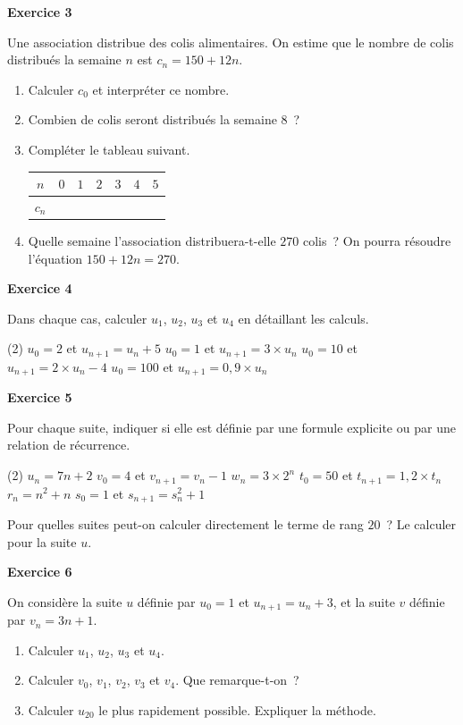 \documentclass[a4paper,11pt]{article}
\newenvironment{exercice}[1]{%
  \Needspace{6\baselineskip}\par\bigskip\noindent\textbf{Exercice #1}\par\smallskip\noindent\ignorespaces
}{%
  \par
}
\begin{document}
\begin{exercice}{3}
Une association distribue des colis alimentaires. On estime que le nombre de colis distribués la semaine $n$ est $c_n = 150 + 12n$.
\begin{enumerate}[label=\arabic*.]
\item Calculer $c_0$ et interpréter ce nombre.
\item Combien de colis seront distribués la semaine $8$~?
\item Compléter le tableau suivant.

\renewcommand{\arraystretch}{1.4}
\begin{tabular}{|c|*{6}{C{1.1cm}|}}
  \hline
  $n$ & $0$ & $1$ & $2$ & $3$ & $4$ & $5$ \\
  \hline
  $c_n$ & & & & & & \\
  \hline
\end{tabular}
\item Quelle semaine l'association distribuera-t-elle $270$ colis~? On pourra résoudre l'équation $150 + 12n = 270$.
\end{enumerate}
\end{exercice}

\begin{exercice}{4}
Dans chaque cas, calculer $u_1$, $u_2$, $u_3$ et $u_4$ en détaillant les calculs.
\begin{tasks}(2)
\task $u_0 = 2$ et $u_{n+1} = u_n + 5$
\task $u_0 = 1$ et $u_{n+1} = 3 \times u_n$
\task $u_0 = 10$ et $u_{n+1} = 2 \times u_n - 4$
\task $u_0 = 100$ et $u_{n+1} = 0{,}9 \times u_n$
\end{tasks}
\end{exercice}

\begin{exercice}{5}
Pour chaque suite, indiquer si elle est définie par une formule explicite ou par une relation de récurrence.
\begin{tasks}(2)
\task $u_n = 7n + 2$
\task $v_0 = 4$ et $v_{n+1} = v_n - 1$
\task $w_n = 3 \times 2^n$
\task $t_0 = 50$ et $t_{n+1} = 1{,}2 \times t_n$
\task $r_n = n^2 + n$
\task $s_0 = 1$ et $s_{n+1} = s_n^2 + 1$
\end{tasks}
Pour quelles suites peut-on calculer directement le terme de rang $20$~? Le calculer pour la suite $u$.
\end{exercice}

\begin{exercice}{6}
On considère la suite $u$ définie par $u_0 = 1$ et $u_{n+1} = u_n + 3$, et la suite $v$ définie par $v_n = 3n + 1$.
\begin{enumerate}[label=\arabic*.]
\item Calculer $u_1$, $u_2$, $u_3$ et $u_4$.
\item Calculer $v_0$, $v_1$, $v_2$, $v_3$ et $v_4$. Que remarque-t-on~?
\item Calculer $u_{20}$ le plus rapidement possible. Expliquer la méthode.
\end{enumerate}
\end{exercice}
\end{document}
